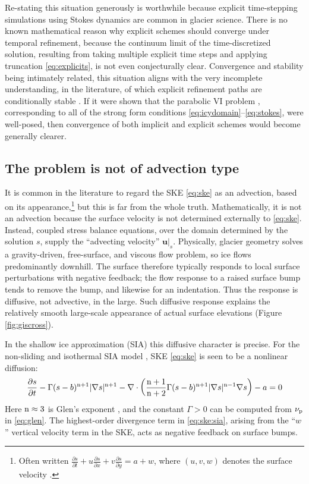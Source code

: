 \documentclass[hidelinks,onefignum,onetabnum,final]{siamart220329}  %
\newcommand{\grad}{\nabla}
\newcommand{\Div}{\nabla\cdot}
\newcommand{\bu}{\mathbf{u}}
\newcommand{\nn}{{\text{\textnormal{n}}}}
\newcommand{\pp}{{\text{\textnormal{p}}}}
\begin{document}
Re-stating this situation generously is worthwhile because explicit time-stepping simulations using Stokes dynamics are common in glacier science.  There is no known mathematical reason why explicit schemes should converge under temporal refinement, because the continuum limit of the time-discretized solution, resulting from taking multiple explicit time steps and applying truncation \eqref{eq:explicits}, is not even conjecturally clear.  Convergence and stability being intimately related, this situation aligns with the very incomplete understanding, in the literature, of which explicit refinement paths are conditionally stable \cite[and references therein]{Bueler2023,Chengetal2017,LofgrenAhlkronaHelanow2022}.  If it were shown that the parabolic  VI problem \cite{Glowinski1984}, corresponding to all of the strong form conditions \eqref{eq:icydomain}--\eqref{eq:stokes}, were well-posed, then convergence of both implicit and explicit schemes would become generally clearer.

\subsection{The problem is not of advection type} \label{subsec:notadv}  It is common in the literature to regard the SKE \eqref{eq:ske} as an advection, based on its appearance,\footnote{Often written $\frac{\partial s}{\partial t} + u \frac{\partial s}{\partial x} + v \frac{\partial s}{\partial y} = a + w$, where $(u,v,w)$ denotes the surface velocity \cite{GreveBlatter2009,SchoofHewitt2013}.} but this is far from the whole truth.  Mathematically, it is not an advection because the surface velocity is not determined externally to \eqref{eq:ske}.  Instead, coupled stress balance equations, over the domain determined by the solution $s$, supply the ``advecting velocity'' $\bu|_s$.  Physically, glacier geometry solves a gravity-driven, free-surface, and viscous flow problem, so ice flows predominantly downhill.  The surface therefore typically responds to local surface perturbations with negative feedback; the flow response to a raised surface bump tends to remove the bump, and likewise for an indentation.  Thus the response is diffusive, not advective, in the large.  Such diffusive response explains the relatively smooth large-scale appearance of actual surface elevations (Figure \ref{fig:giscross}).

In the shallow ice approximation (SIA) this diffusive character is precise.  For the non-sliding and isothermal SIA model \cite{GreveBlatter2009,JouvetBueler2012}, SKE \eqref{eq:ske} is seen to be a nonlinear diffusion:
\begin{equation}
\frac{\partial s}{\partial t} - \Gamma (s-b)^{\nn+1} |\grad s|^{\nn+1} - \Div \left(\frac{\nn+1}{\nn+2} \Gamma (s-b)^{\nn+1} |\grad s|^{\nn-1} \grad s\right) - a = 0  \label{eq:ske:sia}
\end{equation}
Here $\nn\approx 3$ is Glen's exponent \cite{GreveBlatter2009}, and the constant $\Gamma>0$ can be computed from $\nu_\pp$ in \eqref{eq:glen}.  The highest-order divergence term in \eqref{eq:ske:sia}, arising from the ``$w$'' vertical velocity term in the SKE, acts as negative feedback on surface bumps.
\end{document}
